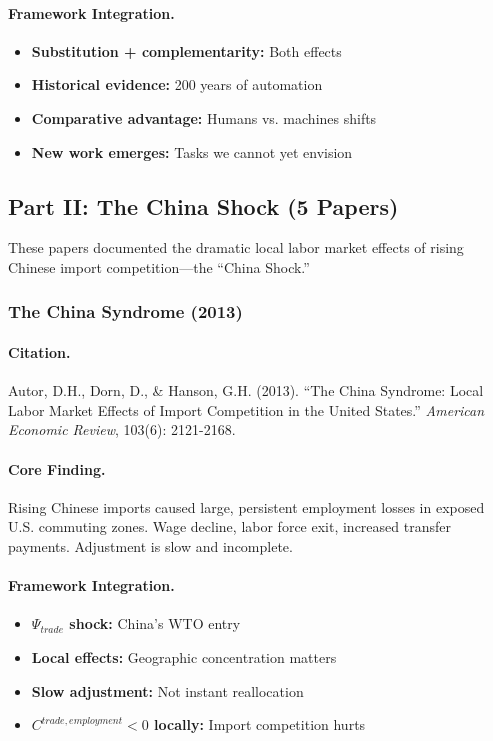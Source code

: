 \paragraph{Framework Integration.}
\begin{itemize}
  \item \textbf{Substitution + complementarity:} Both effects
  \item \textbf{Historical evidence:} 200 years of automation
  \item \textbf{Comparative advantage:} Humans vs. machines shifts
  \item \textbf{New work emerges:} Tasks we cannot yet envision
\end{itemize}

\subsection{Part II: The China Shock (5 Papers)}

These papers documented the dramatic local labor market effects of rising
Chinese import competition---the ``China Shock.''

\subsubsection{The China Syndrome (2013)}

\paragraph{Citation.}
Autor, D.H., Dorn, D., \& Hanson, G.H. (2013). ``The China Syndrome:
Local Labor Market Effects of Import Competition in the United States.''
\emph{American Economic Review}, 103(6): 2121-2168.

\paragraph{Core Finding.}
Rising Chinese imports caused large, persistent employment losses in
exposed U.S. commuting zones. Wage decline, labor force exit, increased
transfer payments. Adjustment is slow and incomplete.

\paragraph{Framework Integration.}
\begin{itemize}
  \item \textbf{$\Psi_{trade}$ shock:} China's WTO entry
  \item \textbf{Local effects:} Geographic concentration matters
  \item \textbf{Slow adjustment:} Not instant reallocation
  \item \textbf{$C^{trade,employment} < 0$ locally:} Import competition hurts
\end{itemize}

